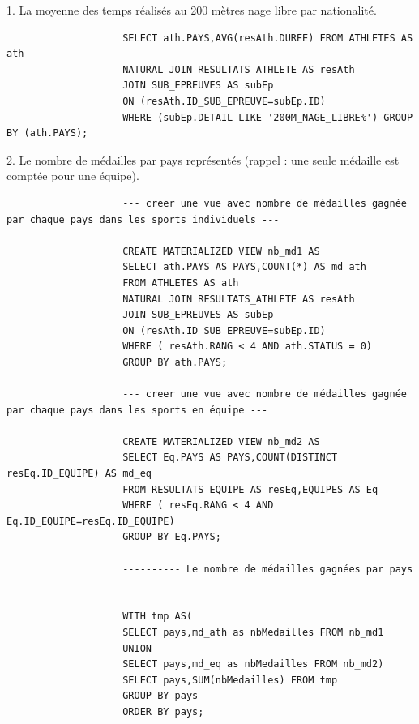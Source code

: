 \documentclass[]{scrreprt}
\begin{document}
			{\large 
				1. La moyenne des temps réalisés au 200 mètres nage libre par nationalité.
				
			}
			
			{\footnotesize 
				\begin{tcolorbox}
					\begin{verbatim}
					SELECT ath.PAYS,AVG(resAth.DUREE) FROM ATHLETES AS ath 
					NATURAL JOIN RESULTATS_ATHLETE AS resAth 
					JOIN SUB_EPREUVES AS subEp
					ON (resAth.ID_SUB_EPREUVE=subEp.ID) 
					WHERE (subEp.DETAIL LIKE '200M_NAGE_LIBRE%') GROUP BY (ath.PAYS);
					\end{verbatim}
				\end{tcolorbox}
			}
			
			\vspace{0.5cm}
			
			{\large 
				2. Le nombre de médailles par pays représentés (rappel : une seule médaille est comptée pour une
				équipe).
				
			}
			
			{\footnotesize 
				\begin{tcolorbox}
					\begin{verbatim}
					--- creer une vue avec nombre de médailles gagnée par chaque pays dans les sports individuels ---
					
					CREATE MATERIALIZED VIEW nb_md1 AS
					SELECT ath.PAYS AS PAYS,COUNT(*) AS md_ath 
					FROM ATHLETES AS ath 
					NATURAL JOIN RESULTATS_ATHLETE AS resAth 
					JOIN SUB_EPREUVES AS subEp
					ON (resAth.ID_SUB_EPREUVE=subEp.ID) 
					WHERE ( resAth.RANG < 4 AND ath.STATUS = 0)
					GROUP BY ath.PAYS;
					
					--- creer une vue avec nombre de médailles gagnée par chaque pays dans les sports en équipe ---
					
					CREATE MATERIALIZED VIEW nb_md2 AS
					SELECT Eq.PAYS AS PAYS,COUNT(DISTINCT resEq.ID_EQUIPE) AS md_eq 
					FROM RESULTATS_EQUIPE AS resEq,EQUIPES AS Eq
					WHERE ( resEq.RANG < 4 AND Eq.ID_EQUIPE=resEq.ID_EQUIPE)
					GROUP BY Eq.PAYS;
					
					---------- Le nombre de médailles gagnées par pays ----------
					
					WITH tmp AS(
					SELECT pays,md_ath as nbMedailles FROM nb_md1
					UNION
					SELECT pays,md_eq as nbMedailles FROM nb_md2)
					SELECT pays,SUM(nbMedailles) FROM tmp
					GROUP BY pays
					ORDER BY pays;
					\end{verbatim}
				\end{tcolorbox}
			}
			
\end{document}
